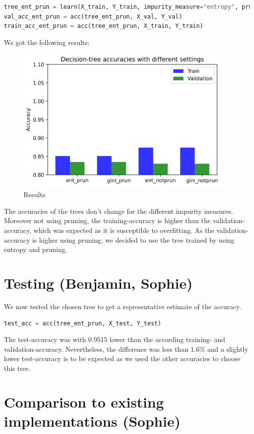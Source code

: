 \documentclass[12pt,a4paper]{scrartcl}		%
\begin{document}
\begin{lstlisting}[language=Python]
    tree_ent_prun = learn(X_train, Y_train, impurity_measure="entropy", pruning=True)
val_acc_ent_prun = acc(tree_ent_prun, X_val, Y_val)
train_acc_ent_prun = acc(tree_ent_prun, X_train, Y_train)
\end{lstlisting}

We got the following results: 

\begin{figure}[h]
    \centering
    \includegraphics[scale = 0.8]{results.png}
    \caption{Results}
\end{figure}

The accuracies of the trees don’t change for the different impurity measures. Moreover not using pruning, 
the training-accuracy is higher than the validation-accuracy, which was expected as it is susceptible to 
overfitting. As the validation-accuracy is higher using pruning, we decided to use the tree trained by using 
entropy and pruning.

\section{Testing (Benjamin, Sophie)}
We now tested the chosen tree to get a representative estimate of the accuracy. 

\begin{lstlisting}[language=Python]
    test_acc = acc(tree_ent_prun, X_test, Y_test)
\end{lstlisting}

The test-accuracy was with 0.9515 lower than the according training- and validation-accuracy. Nevertheless, 
the difference was less than 1.6\% and a slightly lower test-accuracy is to be expected as we used the other 
accuracies to choose this tree.  

\section{Comparison to existing implementations (Sophie)}
\end{document}
